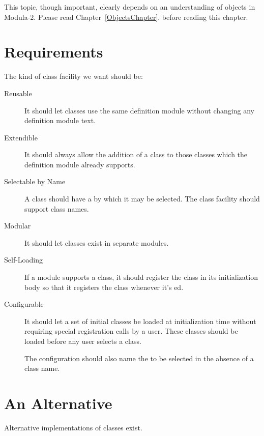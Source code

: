 This topic, though important, clearly depends on an understanding of objects
in Modula-2.  Please read Chapter~\ref{ObjectsChapter}.
 before reading this chapter.

\section{Requirements}

The kind of class facility we want should be:
\begin{description}
\item[Reusable]\indent\par
  It should let classes use the same definition module without changing any
  definition module text.

\newpage

\item[Extendible]\indent\par
  It should always allow the addition of a class to those classes which the
  definition module already supports.
\item[Selectable by Name]\indent\par
  A class should have a  by which it 
  may be selected.
  The class facility should support class names.
\item[Modular]\indent\par
  It should let classes exist in separate modules.
\item[Self-Loading]\indent\par
  If a module supports a class, it should register the class in its
  initialization body so that it registers the class whenever it's
  ed.
\item[Configurable]\indent\par
  It should let a set of initial classes be loaded at initialization time
  without requiring special registration calls by a user.  These classes
  should be loaded before any user selects a class.

  The configuration should also name the  to be
  selected in the absence of a class name.
\end{description}

\section{An Alternative}

Alternative
implementations of classes exist.

